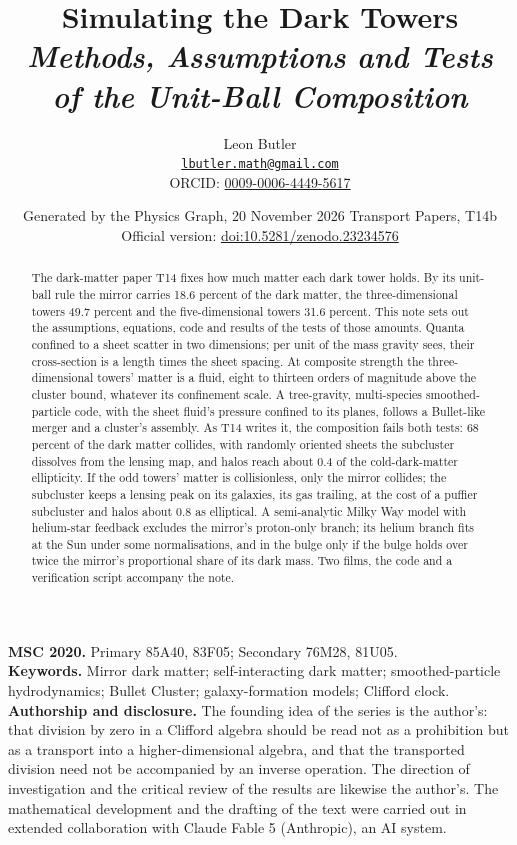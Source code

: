 \documentclass[11pt]{article}
\title{\bfseries Simulating the Dark Towers\\[4pt]\large\itshape Methods, Assumptions and Tests of the Unit-Ball Composition}
\author{Leon Butler\\ \normalsize\href{mailto:lbutler.math@gmail.com}{\texttt{lbutler.math@gmail.com}}\\ \normalsize ORCID: \href{https://orcid.org/0009-0006-4449-5617}{0009-0006-4449-5617}}
\date{Generated by the Physics Graph, 20 November 2026 \textperiodcentered{} Transport Papers, T14b\\[3pt]\small Official version: \href{https://doi.org/10.5281/zenodo.23234576}{doi:10.5281/zenodo.23234576}}
\theoremstyle{definition}
\theoremstyle{plain}
\begin{document}
\maketitle
\begin{abstract}
\normalsize
The dark-matter paper T14 fixes how much matter each dark tower holds. By its unit-ball rule the mirror carries 18.6 percent of the dark matter, the three-dimensional towers 49.7 percent and the five-dimensional towers 31.6 percent. This note sets out the assumptions, equations, code and results of the tests of those amounts. Quanta confined to a sheet scatter in two dimensions; per unit of the mass gravity sees, their cross-section is a length times the sheet spacing. At composite strength the three-dimensional towers' matter is a fluid, eight to thirteen orders of magnitude above the cluster bound, whatever its confinement scale. A tree-gravity, multi-species smoothed-particle code, with the sheet fluid's pressure confined to its planes, follows a Bullet-like merger and a cluster's assembly. As T14 writes it, the composition fails both tests: 68 percent of the dark matter collides, with randomly oriented sheets the subcluster dissolves from the lensing map, and halos reach about 0.4 of the cold-dark-matter ellipticity. If the odd towers' matter is collisionless, only the mirror collides; the subcluster keeps a lensing peak on its galaxies, its gas trailing, at the cost of a puffier subcluster and halos about 0.8 as elliptical. A semi-analytic Milky Way model with helium-star feedback excludes the mirror's proton-only branch; its helium branch fits at the Sun under some normalisations, and in the bulge only if the bulge holds over twice the mirror's proportional share of its dark mass. Two films, the code and a verification script accompany the note.
\end{abstract}
\medskip
\noindent\textbf{MSC 2020.} Primary 85A40, 83F05; Secondary 76M28, 81U05.\\
\textbf{Keywords.} Mirror dark matter; self-interacting dark matter; smoothed-particle hydrodynamics; Bullet Cluster; galaxy-formation models; Clifford clock.
\newpage
\noindent \textbf{Authorship and disclosure. }The founding idea of the series is the author's: that division by zero in a Clifford algebra should be read not as a prohibition but as a transport into a higher-dimensional algebra, and that the transported division need not be accompanied by an inverse operation. The direction of investigation and the critical review of the results are likewise the author's. The mathematical development and the drafting of the text were carried out in extended collaboration with Claude Fable 5 (Anthropic), an AI system.
\end{document}
